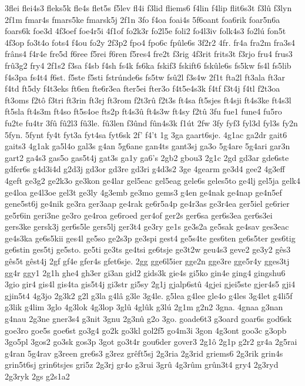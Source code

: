 {3flei
flei4s3
fleks5k
fle4s
flet5s
f5lev
fl4i
f3lid
fliems6
f4lin
f4lip
flit6s3t
f3lû
f3lyn
2f1m
fmar4s
fmars5ke
fmarsk5j
2f1n
3fo
f4oa
foai4s
5f6oant
foa6rik
foar5n6a
foars6k
foe3d
4f3oef
foe4r5i
4f1of
fo2k3r
fo2l5e
foli2
fo4l3iv
folk4s3
fo2lú
fon5t
4f3op
fo3t4o
fots4
f4ou
fo2y
2f3p2
fpo4
fpo6c
fpûle6s
3f2r2
4fr.
fr4a
fra2m
fra3s4
frâns4
f4r4e
fre5d
f6ree
f5rei
f6ren
f5res4
fre2t
f3rig
4f3rit
frits3t
f3rjo
fru4
frus3
frû3g2
fry4
2f1s2
f3sa
f4sb
f4sh
fs4k
fs6ka
fskif3
fskift6
fskûle6s
fs5kw
fs4l
fs5lib
f4s3pa
fs4t4
f6st.
f5ste
f5sti
fstrúnde6s
fs5tw
fsû2l
f3s4w
2f1t
fta2l
ft3ala
ft3ar
f4td
ft5dy
f4t3eks
ft6en
fte6r3ea
fter5ei
fter3o
f4t5e4s3k
f4tf
f3t4j
f4tl
f2t3oa
ft3oms
f2tô
f3tri
ft3rin
ft3rj
ft3rom
f2t3rû
f2t3s
ft4sa
ft5sjes
ft4sji
ft4s3ke
ft4s3l
ft5sla
ft4s3m
ft4so
ft5s4oe
fts2p
ft4s3û
ft4s3w
ft4sy
f2tû
3fu
fue1
fune4
fu5ro
fu2te
fu4tr
3fû
fû2l3
fû3le.
fû3len
f3ûnd
fûn4s3k
f1út
2fw
3fy
fyf3
fyl3d
fyl3s
fy2n
5fyn.
5fynt
fy4t
fyt3a
fyt4sa
fyt6sk
2f'
f4't
1g
3ga
gaart6sje.
4g1ac
ga2dr
gait6
gaits3
4g1ak
ga5l4o
gal3s
g4an
5g6ane
gan4ts
gant3sj
ga3o
5g4are
5g4ari
gar3n
gart2
ga4s3
gas5o
gas5t4j
gat3s
ga1y
ga6's
2gb2
gbou3
2g1c
2gd
gd3ar
gde6ste
gdfer6s
g4d3i4d
g2d3j
gd3or
gd3re
gd3ri
g4d3s2
3ge
4gearm
ge3d4
gee2
4g3eff
4geft
ge3g2
ge2k3o
ge3kon
ge4lar
gel5eac
gel5eag
gele6s
geles5to
ge4lj
gel5ja
gelk4
ge4loa
ge4l3oe
gel3t
ge3ly
4g3emb
ge3mo
gems3
g4en
ge4nak
ge4nap
ge4n5ef
gene5st6j
ge4nik
ge3ra
ger3aap
ge4rak
ge6r5a4p
ge4r3as
ge3r4ea
ger5iel
ge6rier
ge5r6in
geri3ne
ge3ro
ge4roa
ge6roed
ger4of
ger2s
ger6sa
ger6s3ea
ger6s3ei
gers3ke
gersk3j
ger6s5le
gers5lj
ger3t4
ge3ry
ge1s
ge3s2a
ge5sak
ge4sav
ges3eac
ge4s3ka
ge6s5kii
ges4l
ge5so
ge2s3p
ge3spi
gest4
ge5s4te
ges6ten
ge6s5ter
ges6tig
ge6stin
ges5tj
ge5sto.
ge5ti
ge3ts
ge4tsi
ge6tsje
ge3t2w
geu4s3
geve2
ge3y2
gês3
gês5t
gêst4j
2gf
gf4e
gfer4s
gfet6sje.
2gg
gge6l5ier
gge2n
gge3re
gge5r4y
gges3tj
gg4r
ggy1
2g1h
ghe4
gh3er
gi3an
gid2
gids3k
gie4s
gi5ko
gin4e
ging4
gingshu6
3gio
gir4
gis4l
gis4ta
gis5t4j
gi3str
gi5sy
2g1j
gjalp6stû
4gjei
gjei5ste
gjer4s5
gji4
gjin5t4
4g3jo
2g3k2
g2l
g3la
g4lâ
g3le
3g4le.
g5lea
g4lee
gle4o
g4les
3g4let
g4li5f
g3lik
g4lim
3glo
4g3lok
4g3lop
3glû
4glûk
g3lú
2g1m
g2n2
3gna.
4gnaa
g3nan
g4nau
2g3ne
gner3s4
g3nit
3gnu
2g3nû
g2o
3go.
goade6t3
g3oard
goar6s
god6sk
goe3ro
goe5s
goe6st
go3g4
go2k
go3kl
gol2f5
go4m3i
3gon
4g3ont
goo3c
g3opb
3go5pl
3gos2
go3sk
gos3p
3got
go3t4r
gou6der
gover3
2g1ô
2g1p
g2r2
gr4a
2g5rai
g4ran
5g4rav
g3reen
gre6s3
g3rez
grêft5sj
2g3ria
2g3rid
griems6
2g3rik
grin4s
grin5t6sj
grin6tsjes
gri5z
2g3rj
gr4o
g3rui
3grû
4g3rûm
grûn3t4
gry4
2g3ryd
2g3ryk
2gs
g2s1a2
}
